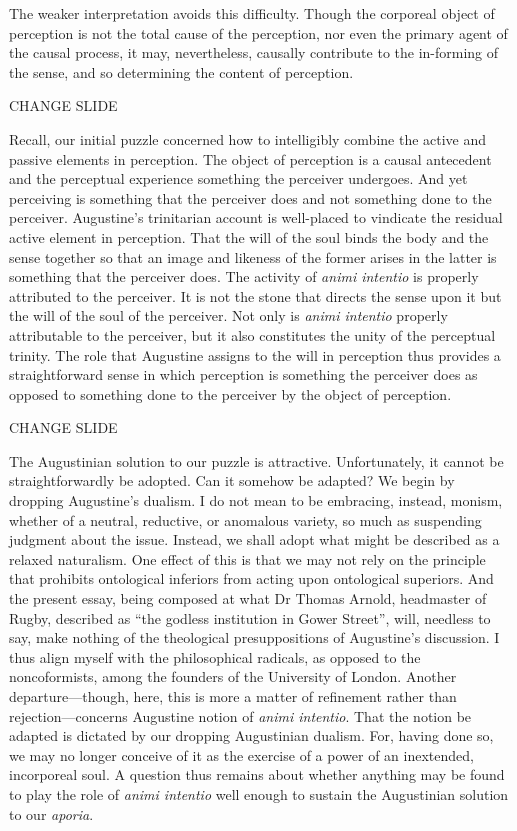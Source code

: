 \documentclass[12pt]{article}
\begin{document}
The weaker interpretation avoids this difficulty. Though the corporeal object of perception is not the total cause of the perception, nor even the primary agent of the causal process, it may, nevertheless, causally contribute to the in-forming of the sense, and so determining the content of perception.

CHANGE SLIDE

Recall, our initial puzzle concerned how to intelligibly combine the active and passive elements in perception. The object of perception is a causal antecedent and the perceptual experience something the perceiver undergoes. And yet perceiving is something that the perceiver does and not something done to the perceiver. Augustine’s trinitarian account is well-placed to vindicate the residual active element in perception. That the will of the soul binds the body and the sense together so that an image and likeness of the former arises in the latter is something that the perceiver does. The activity of \emph{animi intentio} is properly attributed to the perceiver. It is not the stone that directs the sense upon it but the will of the soul of the perceiver. Not only is \emph{animi intentio} properly attributable to the perceiver, but it also constitutes the unity of the perceptual trinity. The role that Augustine assigns to the will in perception thus provides a straightforward sense in which perception is something the perceiver does as opposed to something done to the perceiver by the object of perception.

CHANGE SLIDE

The Augustinian solution to our puzzle is attractive. Unfortunately, it cannot be straightforwardly be adopted. Can it somehow be adapted? We begin by dropping Augustine’s dualism. I do not mean to be embracing, instead, monism, whether of a neutral, reductive, or anomalous variety, so much as suspending judgment about the issue. Instead, we shall adopt what might be described as a relaxed naturalism. One effect of this is that we may not rely on the principle that prohibits ontological inferiors from acting upon ontological superiors. And the present essay, being composed at what Dr Thomas Arnold, headmaster of Rugby, described as “the godless institution in Gower Street”, will, needless to say, make nothing of the theological presuppositions of Augustine’s discussion. I thus align myself with the philosophical radicals, as opposed to the noncoformists, among the founders of the University of London. Another departure—though, here, this is more a matter of refinement rather than rejection—concerns Augustine notion of \emph{animi intentio}. That the notion be adapted is dictated by our dropping Augustinian dualism. For, having done so, we may no longer conceive of it as the exercise of a power of an inextended, incorporeal soul. A question thus remains about whether anything may be found to play the role of \emph{animi intentio} well enough to sustain the Augustinian solution to our \emph{aporia}.
\end{document}
